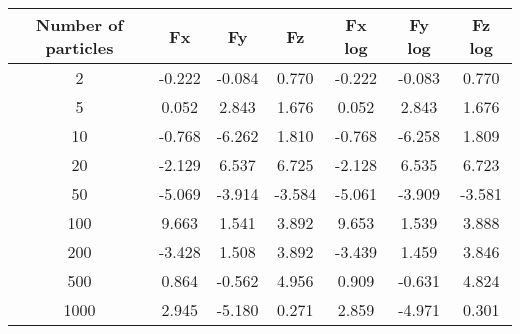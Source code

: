 \begin{tabular}{ccccccc}
\hline \hline
 Number of particles &     Fx &     Fy &     Fz &  Fx log &  Fy log &  Fz log \\
\hline \hline
                   2 & -0.222 & -0.084 &  0.770 &  -0.222 &  -0.083 &   0.770 \\
                   5 &  0.052 &  2.843 &  1.676 &   0.052 &   2.843 &   1.676 \\
                  10 & -0.768 & -6.262 &  1.810 &  -0.768 &  -6.258 &   1.809 \\
                  20 & -2.129 &  6.537 &  6.725 &  -2.128 &   6.535 &   6.723 \\
                  50 & -5.069 & -3.914 & -3.584 &  -5.061 &  -3.909 &  -3.581 \\
                 100 &  9.663 &  1.541 &  3.892 &   9.653 &   1.539 &   3.888 \\
                 200 & -3.428 &  1.508 &  3.892 &  -3.439 &   1.459 &   3.846 \\
                 500 &  0.864 & -0.562 &  4.956 &   0.909 &  -0.631 &   4.824 \\
                1000 &  2.945 & -5.180 &  0.271 &   2.859 &  -4.971 &   0.301 \\
\hline \hline
\end{tabular}
